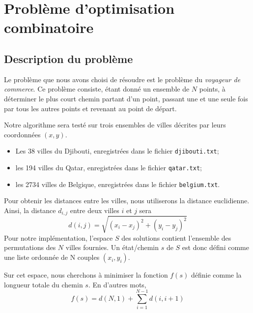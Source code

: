 \documentclass[a4paper, 12pt]{report}
\begin{document}
	\chapter{Problème d'optimisation combinatoire}
	\section{Description du problème}
	Le problème que nous avons choisi de résoudre est le problème du \emph{voyageur de commerce}. Ce problème consiste, étant donné un ensemble de $N$ points, à déterminer le plus court chemin partant d'un point, passant une et une seule fois par tous les autres points et revenant au point de départ.\par
	Notre algorithme sera testé sur trois ensembles de villes décrites par leurs coordonnées $(x, y)$.
    \begin{itemize}
        \item Les \num{38} villes du Djibouti, enregistrées dans le fichier \texttt{djibouti.txt};
        \item les \num{194} villes du Qatar, enregistrées dans le fichier \texttt{qatar.txt}; \cite{national_tsp}
    	\item les \num{2734} villes de Belgique, enregistrées dans le fichier \texttt{belgium.txt}.
    \end{itemize}
	
	
	Pour obtenir les distances entre les villes, nous utiliserons la distance euclidienne. Ainsi, la distance $d_{i,j}$ entre deux villes $i$ et $j$ sera
	\begin{equation}
	    d(i,j) = \sqrt{(x_i - x_j)^2 + (y_i - y_j)^2}
	\end{equation}
	Pour notre implémentation, l'espace $S$ des solutions contient l'ensemble des permutations des $N$ villes fournies. Un état/chemin $s$ de $S$ est donc défini comme une liste ordonnée de N couples $(x_i, y_i)$. \par
	Sur cet espace, nous cherchons à minimiser la fonction $f(s)$ définie comme la longueur totale du chemin $s$. En d'autres mots,
	\begin{equation}
	    f(s) = d(N,1) + \sum_{i = 1}^{N-1} d(i,i+1)
	\end{equation}
\end{document}
